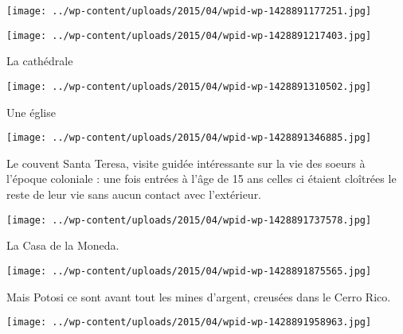  

\begin{center} \texttt{[image: ../wp-content/uploads/2015/04/wpid-wp-1428891177251.jpg]} \end{center}



 

\begin{center} \texttt{[image: ../wp-content/uploads/2015/04/wpid-wp-1428891217403.jpg]} \end{center}



 La cathédrale

 

\begin{center} \texttt{[image: ../wp-content/uploads/2015/04/wpid-wp-1428891310502.jpg]} \end{center}



 Une église

 

\begin{center} \texttt{[image: ../wp-content/uploads/2015/04/wpid-wp-1428891346885.jpg]} \end{center}



 Le couvent Santa Teresa, visite guidée intéressante sur la vie des soeurs à l'époque coloniale : une fois entrées à l'âge de 15 ans celles ci étaient cloîtrées le reste de leur vie sans aucun contact avec l'extérieur. 

 

\begin{center} \texttt{[image: ../wp-content/uploads/2015/04/wpid-wp-1428891737578.jpg]} \end{center}



 La Casa de la Moneda. 

 

\begin{center} \texttt{[image: ../wp-content/uploads/2015/04/wpid-wp-1428891875565.jpg]} \end{center}



 Mais Potosi ce sont avant tout les mines d'argent, creusées dans le Cerro Rico.

 

\begin{center} \texttt{[image: ../wp-content/uploads/2015/04/wpid-wp-1428891958963.jpg]} \end{center}



